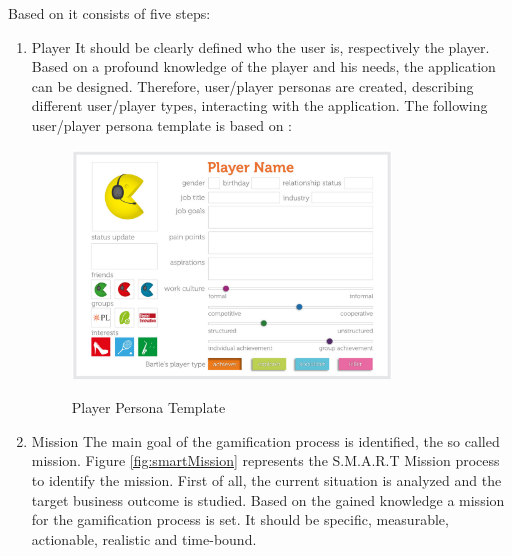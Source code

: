 Based on \cite[p. 29-32]{kumarGamificationWorkDesigning2013} it consists of five steps:
\begin{enumerate}
	\item Player \newline
	It should be clearly defined who the user is, respectively the player. Based on a profound knowledge of the player and his needs, the application can be designed. Therefore, user/player personas are created, describing different user/player types, interacting with the application. The following user/player persona template is based on \cite[p. 38-45]{kumarGamificationWorkDesigning2013}:

	\begin{figure}[htbp] 
		\centering
		\includegraphics[width=0.8\textwidth]{Content/Theory/PlayerPersona.png}
		\caption{Player Persona Template}
		\cite[p. 46]{kumarGamificationWorkDesigning2013}
		\label{fig:playerPersonaTemplate}
	\end{figure}
	
	\item Mission \newline
	The main goal of the gamification process is identified, the so called mission. Figure \ref{fig:smartMission} represents the S.M.A.R.T Mission process to identify the mission. First of all, the current situation is analyzed and the target business outcome is studied. Based on the gained knowledge a mission for the gamification process is set. It should be specific, measurable, actionable, realistic and time-bound. \cite[p. 49-52]{kumarGamificationWorkDesigning2013}
	

\end{enumerate}
